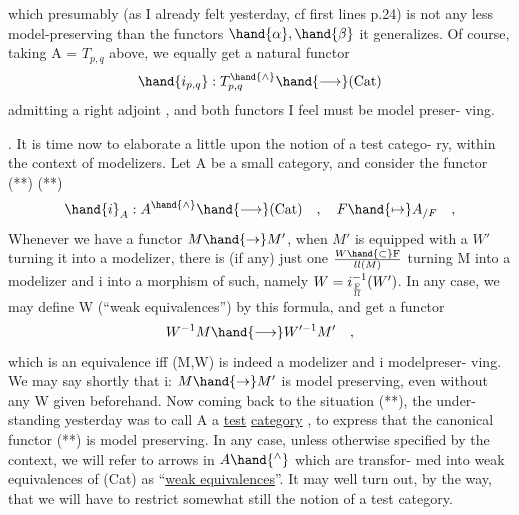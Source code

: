 which presumably (as I already felt yesterday, cf first lines p.24) is not
any less model-preserving than the functors $\hand{\alpha},\hand{\beta}$ it generalizes.  Of course,
taking A = $T_{p,q}$ above,  we equally get a natural functor
\[ \hand{i_{p,q}} : T^{\hand{\wedge}}_{p,q} \hand{\longrightarrow} (\mathrm{Cat}) \]
 admitting a right adjoint , and both functors I feel must be model preser-%
ving.

.  It is time now to elaborate a little upon the notion of a test catego-%
ry,  within the context of modelizers.  Let A be a small category,  and
consider  the functor (**)
 (**) \[ \hand{i}_{A} : A^{\hand{\wedge}} \hand{\longrightarrow} (\mathrm{Cat}) \quad , \quad F \hand{\mapsto} A_{/F} \quad , \]
Whenever we have a functor  $M \hand{\to} M'$,  when $M'$ is equipped with a $W'$ turning
it into a modelizer,  there is (if any)  just one $W \hand{\subset} \mathrm{F}\over{l}{l}(M)$ turning M into
a modelizer and i into a morphism of such,  namely $W = i_{\mathrm{F}\over{l}{l}}^{-1}(W')$.  In any
case,  we may define W (``weak equivalences'') by this formula,  and get a
functor
\[ W^{-1}M \hand{\longrightarrow} W'^{-1}M' \quad , \]
which is an equivalence iff (M,W) is indeed a modelizer and i modelpreser-%
ving.  We may say shortly that i: $M \hand{\to} M'$ is model preserving,  even without
any W given beforehand.  Now coming back to the situation  (**),  the under-%
standing yesterday was to call A a \uline{test} \uline{category} ,  to express that the
canonical functor (**) is model preserving. \hand{(}In any case,  unless otherwise
specified by the context, we will refer to arrows in $A\hand{^{\wedge}}$ which are transfor-%
med into weak equivalences of (Cat)  as ``\uline{weak equivalences}''.\hand{)} It may well
turn out,  by the way,  that we will have to restrict somewhat still the
notion of a test category.

